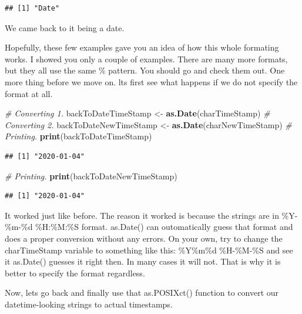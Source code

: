 \documentclass[]{book}
\newenvironment{Shaded}{\begin{snugshade}}{\end{snugshade}}
\newcommand{\CommentTok}[1]{\textcolor[rgb]{0.56,0.35,0.01}{\textit{#1}}}
\newcommand{\DataTypeTok}[1]{\textcolor[rgb]{0.13,0.29,0.53}{#1}}
\newcommand{\KeywordTok}[1]{\textcolor[rgb]{0.13,0.29,0.53}{\textbf{#1}}}
\newcommand{\NormalTok}[1]{#1}
\newcommand{\StringTok}[1]{\textcolor[rgb]{0.31,0.60,0.02}{#1}}
\begin{document}
\begin{verbatim}
## [1] "Date"
\end{verbatim}

We came back to it being a date.

Hopefully, these few examples gave you an idea of how this whole formating works. I showed you only a couple of examples. There are many more formats, but they all use the same \% pattern. You should go and check them out. One more thing before we move on. lts first see what happens if we do not specify the format at all.

\begin{Shaded}
\begin{Highlighting}[]
\CommentTok{# Converting 1.}
\NormalTok{backToDateTimeStamp <-}\StringTok{ }\KeywordTok{as.Date}\NormalTok{(charTimeStamp)}
\CommentTok{# Converting 2.}
\NormalTok{backToDateNewTimeStamp <-}\StringTok{ }\KeywordTok{as.Date}\NormalTok{(charNewTimeStamp)}
\CommentTok{# Printing.}
\KeywordTok{print}\NormalTok{(backToDateTimeStamp)}
\end{Highlighting}
\end{Shaded}

\begin{verbatim}
## [1] "2020-01-04"
\end{verbatim}

\begin{Shaded}
\begin{Highlighting}[]
\CommentTok{# Printing.}
\KeywordTok{print}\NormalTok{(backToDateNewTimeStamp)}
\end{Highlighting}
\end{Shaded}

\begin{verbatim}
## [1] "2020-01-04"
\end{verbatim}

It worked just like before. The reason it worked is because the strings are in \%Y-\%m-\%d \%H:\%M:\%S format. as.Date() can outomatically guess that format and does a proper conversion without any errors. On your own, try to change the charTimeStamp variable to something like this: \%Y\%m\%d \%H-\%M-\%S and see it as.Date() guesses it right then. In many cases it will not. That is why it is better to specify the format regardless.

Now, lets go back and finally use that as.POSIXct() function to convert our datetime-looking strings to actual timestamps.

\begin{Shaded}
\end{Shaded}
\end{document}

